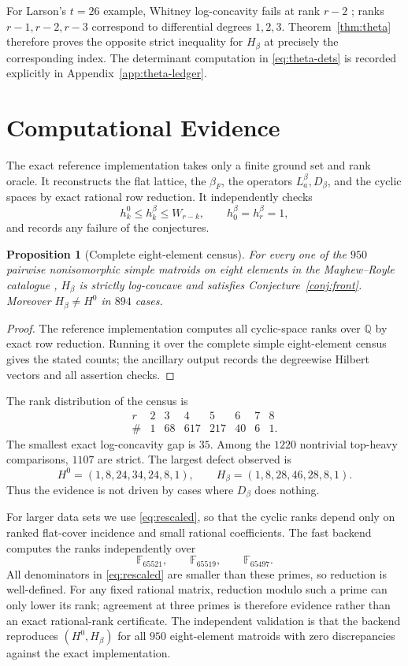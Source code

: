 \documentclass[11pt]{amsart}
\newtheorem{prop}[thm]{Proposition}
\theoremstyle{definition}
\theoremstyle{remark}
\newcommand{\Q}{\mathbb{Q}}
\begin{document}
For Larson's $t=26$ example, Whitney log-concavity fails at rank $r-2$ \cite{Larson}; ranks $r-1,r-2,r-3$ correspond to differential degrees $1,2,3$.  Theorem~\ref{thm:theta} therefore proves the opposite strict inequality for $H_\beta$ at precisely the corresponding index.  The determinant computation in \eqref{eq:theta-dets} is recorded explicitly in Appendix~\ref{app:theta-ledger}.

\section{Computational Evidence}\label{sec:computation}

The exact reference implementation takes only a finite ground set and rank oracle.  It reconstructs the flat lattice, the $\beta_F$, the operators $L_a^\beta,D_\beta$, and the cyclic spaces by exact rational row reduction.  It independently checks
\[
h_k^0\le h_k^\beta\le W_{r-k},\qquad h_0^\beta=h_r^\beta=1,
\]
and records any failure of the conjectures.

\begin{prop}[Complete eight-element census]\label{prop:n8}
For every one of the $950$ pairwise nonisomorphic simple matroids on eight elements in the Mayhew--Royle catalogue \cite{MayhewRoyle}, $H_\beta$ is strictly log-concave and satisfies Conjecture~\ref{conj:front}.  Moreover $H_\beta\ne H^0$ in $894$ cases.
\end{prop}

\begin{proof}
The reference implementation computes all cyclic-space ranks over $\Q$ by exact row reduction. Running it over the complete simple eight-element census gives the stated counts; the ancillary output records the degreewise Hilbert vectors and all assertion checks.
\end{proof}

The rank distribution of the census is
\[
\begin{array}{c|rrrrrrr}
r&2&3&4&5&6&7&8\\\hline
\#&1&68&617&217&40&6&1.
\end{array}
\]
The smallest exact log-concavity gap is $35$.  Among the $1220$ nontrivial top-heavy comparisons, $1107$ are strict.  The largest defect observed is
\[
H^0=(1,8,24,34,24,8,1),\qquad
H_\beta=(1,8,28,46,28,8,1).
\]
Thus the evidence is not driven by cases where $D_\beta$ does nothing.

For larger data sets we use \eqref{eq:rescaled}, so that the cyclic ranks depend only on ranked flat-cover incidence and small rational coefficients.  The fast backend computes the ranks independently over
\[
\mathbb F_{65521},\qquad\mathbb F_{65519},\qquad\mathbb F_{65497}.
\]
All denominators in \eqref{eq:rescaled} are smaller than these primes, so reduction is well-defined.  For any fixed rational matrix, reduction modulo such a prime can only lower its rank; agreement at three primes is therefore evidence rather than an exact rational-rank certificate.  The independent validation is that the backend reproduces $(H^0,H_\beta)$ for all $950$ eight-element matroids with zero discrepancies against the exact implementation.
\end{document}
